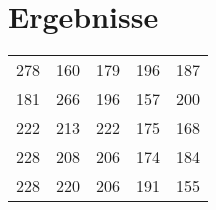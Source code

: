 \chapter{Ergebnisse}
\begin{tabular}{ l | c c c r }
278 & 160 & 179 & 196 & 187 \\
181 & 266 & 196 & 	157 & 200 \\
222 & 213 & 222 & 175 & 168 \\
228 & 208 & 206 & 174 & 184 \\
228 & 220 & 206 & 191 & 155 \\
\end{tabular}